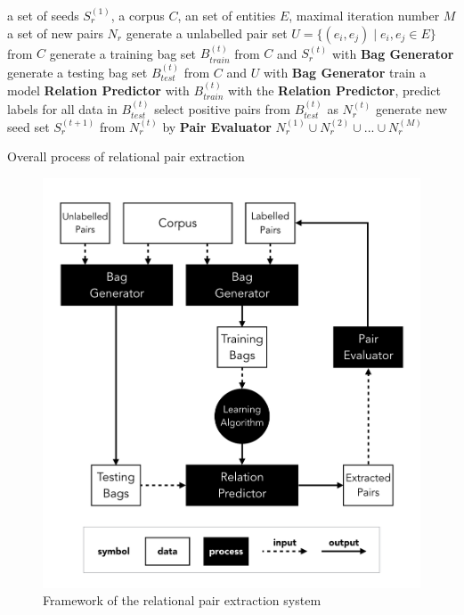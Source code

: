 \begin{algorithm}
\begin{algorithmic}[1]
\renewcommand{\algorithmicrequire}{\textbf{Input:}}
\renewcommand{\algorithmicensure}{\textbf{Output:}}
    \REQUIRE a set of seeds $S_r^{(1)}$, a corpus $C$, an set of entities $E$, maximal iteration number $M$
    \ENSURE a set of new pairs $N_r$
    \STATE generate a unlabelled pair set $U=\{(e_i,e_j) \mid e_i, e_j\in E\}$ from $C$
    \STATE generate a training bag set $B_{train}^{(t)}$ from $C$ and $S_r^{(t)}$ with \textbf{Bag Generator}
    \STATE generate a testing bag set $B_{test}^{(t)}$ from $C$ and $U$ with \textbf{Bag Generator}
    \STATE train a model \textbf{Relation Predictor} with $B_{train}^{(t)}$
    \STATE with the \textbf{Relation Predictor}, predict labels for all data in $B_{test}^{(t)}$
    \STATE select positive pairs from $B_{test}^{(t)}$ as $N_r^{(t)}$
    \STATE generate new seed set $S_r^{(t+1)}$ from $N_r^{(t)}$ by \textbf{Pair Evaluator}
    \ENDFOR
    \RETURN $N_r^{(1)}\cup N_r^{(2)}\cup ...\cup N_r^{(M)}$
\end{algorithmic}
\caption[Overall process of relational pair extraction]{Overall process of relational pair extraction}
\label{algo:process}
\end{algorithm}

\begin{figure}
\centering
\includegraphics[width=1\textwidth]{framework.jpg}
\caption[Framework of the relational pair extraction system]{Framework of the relational pair extraction system}
\label{fig:framework}
\end{figure}

